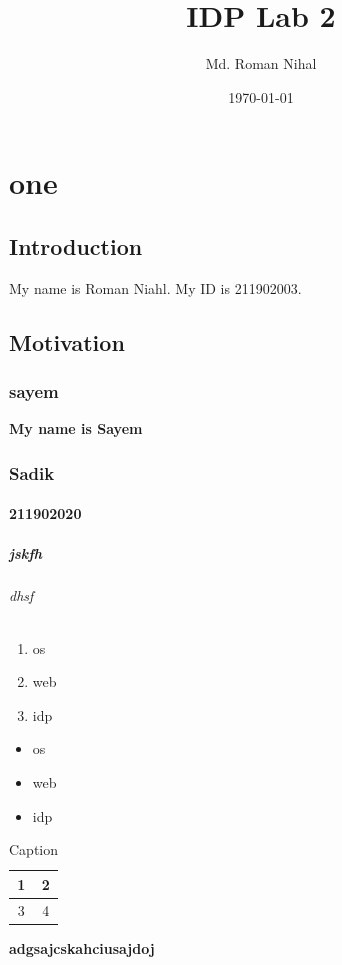 \documentclass[a4paper, 12pt]{report}
\title{IDP Lab 2}
\author{Md. Roman Nihal}
\date{\today}
\begin{document}
\maketitle
\tableofcontents

\newpage
\chapter*{one}
\section{Introduction}
My name is Roman Niahl. My ID is 211902003.\blindtext
\section{Motivation}
\lipsum[1-5]
\subsection{sayem}
\textbf{My name is Sayem}
\subsection{Sadik}
\subsubsection{211902020}
\paragraph{jskfh}
\subparagraph{dhsf}

\begin{enumerate}
    \item os
    \item web
    \item idp
\end{enumerate}

\begin{itemize}
    \item[\dots] os %
    \item[\#] web %
    \item[\textbackslash] idp %
\end{itemize}

\begin{table}[ht]
    \centering
    \begin{tabular}{|c|c|}
    \hline
         1&2  \\\hline
         3&4  \\\hline
    \end{tabular}
    \caption{Caption}
    \label{tab:my_label}
\end{table}
\textbf{adgsajcskahciusajdoj}
\end{document}
